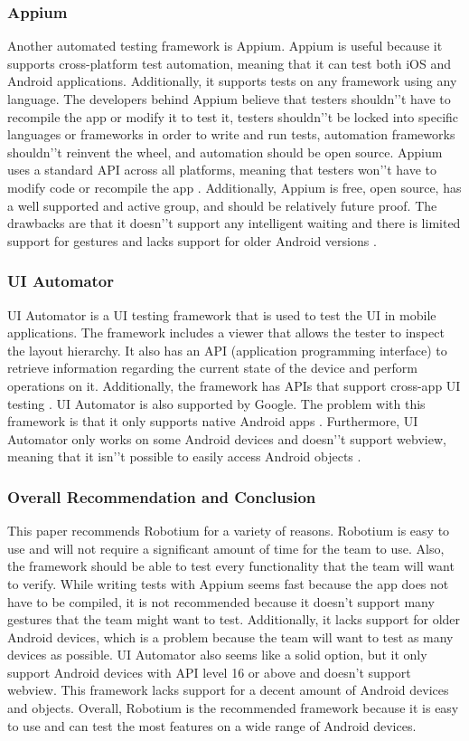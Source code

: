 \documentclass[onecolumn, draftclsnofoot,10pt, compsoc]{IEEEtran}
\begin{document}
\subsubsection{Appium}
Another automated testing framework is Appium. Appium is useful because it supports cross-platform test automation, meaning that it can test both iOS and Android applications. Additionally, it supports tests on any framework using any language. The developers behind Appium believe that testers shouldn'’t have to recompile the app or modify it to test it, testers shouldn'’t be locked into specific languages or frameworks in order to write and run tests, automation frameworks shouldn’'t reinvent the wheel, and automation should be open source. Appium uses a standard API across all platforms, meaning that testers won'’t have to modify code or recompile the app \cite{W-Appium2}.  Additionally, Appium is free, open source, has a well supported and active group, and should be relatively future proof. The drawbacks are that it doesn’'t support any intelligent waiting and there is limited support for gestures and lacks support for older Android versions \cite{W-Appium3}.

\subsubsection{UI Automator}
UI Automator is a UI testing framework that is used to test the UI in mobile applications. The framework includes a viewer that allows the tester to inspect the layout hierarchy. It also has an API (application programming interface) to retrieve information regarding the current state of the device and perform operations on it. Additionally, the framework has APIs that support cross-app UI testing \cite{W-UIAutomator}. UI Automator is also supported by Google. The problem with this framework is that it only supports native Android apps \cite{W-UIAutomator2}. Furthermore, UI Automator only works on some Android devices and doesn'’t support webview, meaning that it isn'’t possible to easily access Android objects \cite{W-UIAutomator3}.

\subsubsection{Overall Recommendation and Conclusion}
This paper recommends Robotium for a variety of reasons. Robotium is easy to use and will not require a significant amount of time for the team to use. Also, the framework should be able to test every functionality that the team will want to verify. While writing tests with Appium seems fast because the app does not have to be compiled, it is not recommended because it doesn't support many gestures that the team might want to test. Additionally, it lacks support for older Android devices, which is a problem because the team will want to test as many devices as possible. UI Automator also seems like a solid option, but it only support Android devices with API level 16 or above and doesn't support webview. This framework lacks support for a decent amount of Android devices and objects. Overall, Robotium is the recommended framework because it is easy to use and can test the most features on a wide range of Android devices.
\end{document}
